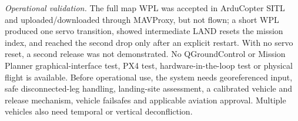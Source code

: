 \emph{Operational validation.} The full map WPL was accepted in ArduCopter SITL and uploaded/downloaded through MAVProxy, but not flown; a short WPL produced one servo transition, showed intermediate LAND resets the mission index, and reached the second drop only after an explicit restart. With no servo reset, a second release was not demonstrated. No QGroundControl or Mission Planner graphical-interface test, PX4 test, hardware-in-the-loop test or physical flight is available. Before operational use, the system needs georeferenced input, safe disconnected-leg handling, landing-site assessment, a calibrated vehicle and release mechanism, vehicle failsafes and applicable aviation approval. Multiple vehicles also need temporal or vertical deconfliction.

